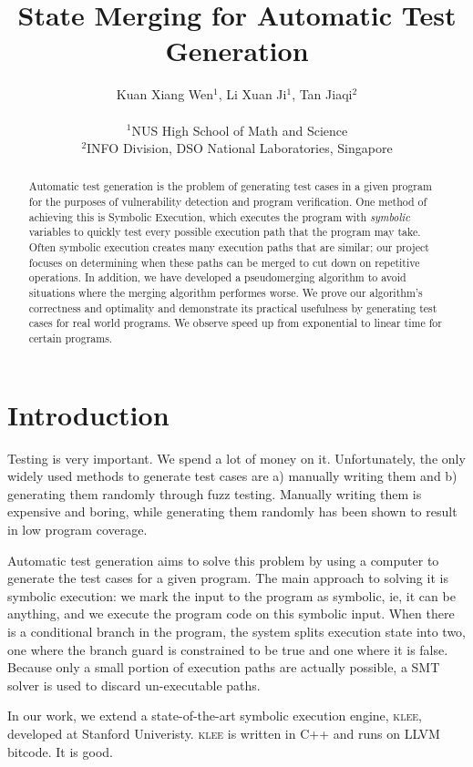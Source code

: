 \documentclass[12pt,a4paper]{article}
\title{State Merging for Automatic Test Generation}
\date{}
\author{
Kuan Xiang Wen$^{1}$, Li Xuan Ji$^{1}$, Tan Jiaqi$^{2}$\\
\vspace{1 mm} \\
\small{$^{1}$NUS High School of Math and Science}\\
\small{$^{2}$INFO Division, DSO National Laboratories, Singapore}
}
\begin{document}
\maketitle
\begin{abstract}
Automatic test generation is the problem of generating test cases in a given program for the purposes of vulnerability detection and program verification. One method of achieving this is Symbolic Execution, which executes the program with \emph{symbolic} variables to quickly test every possible execution path that the program may take. Often symbolic execution creates many execution paths that are similar; our project focuses on determining when these paths can be merged to cut down on repetitive operations. In addition, we have developed a pseudomerging algorithm to avoid situations where the merging algorithm performes worse. We prove our algorithm's correctness and optimality and demonstrate its practical usefulness by generating test cases for real world programs. We observe speed up from exponential to linear time for certain programs.
\end{abstract}

\section{Introduction}
Testing is very important. We spend a lot of money on it. Unfortunately, the only widely used methods to generate test cases are a) manually writing them and b) generating them randomly through fuzz testing. Manually writing them is expensive and boring, while generating them randomly has been shown to result in low program coverage. 

Automatic test generation aims to solve this problem by using a computer to generate the test cases for a given program. The main approach to solving it is symbolic execution: we mark the input to the program as symbolic, ie, it can be anything, and we execute the program code on this symbolic input. When there is a conditional branch in the program, the system splits execution state into two, one where the branch guard is constrained to be true and one where it is false. Because only a small portion of execution paths are actually possible, a SMT solver is used to discard un-executable paths. 

In our work, we extend a state-of-the-art symbolic execution engine, \textsc{klee}, developed at Stanford Univeristy. \textsc{klee} is written in C++ and runs on LLVM bitcode. It is good.
\end{document}

